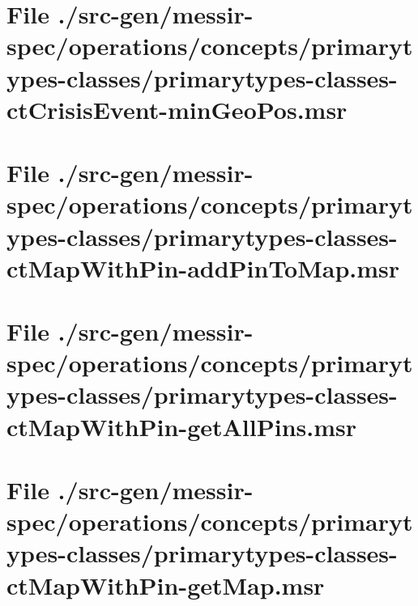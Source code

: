 \section[File /src-gen/messir-spec.../primarytypes-classes-ctCrisisEvent-minGeoPos.msr]{File ./src-gen/messir-spec/operations/concepts/primarytypes-classes/primarytypes-classes-ctCrisisEvent-minGeoPos.msr}
\scriptsize

\normalsize
	
\section[File /src-gen/messir-spec.../primarytypes-classes-ctMapWithPin-addPinToMap.msr]{File ./src-gen/messir-spec/operations/concepts/primarytypes-classes/primarytypes-classes-ctMapWithPin-addPinToMap.msr}
\scriptsize

\normalsize
	
\section[File /src-gen/messir-spec.../primarytypes-classes-ctMapWithPin-getAllPins.msr]{File ./src-gen/messir-spec/operations/concepts/primarytypes-classes/primarytypes-classes-ctMapWithPin-getAllPins.msr}
\scriptsize

\normalsize
	
\section[File /src-gen/messir-spec.../primarytypes-classes-ctMapWithPin-getMap.msr]{File ./src-gen/messir-spec/operations/concepts/primarytypes-classes/primarytypes-classes-ctMapWithPin-getMap.msr}
\scriptsize

\normalsize
	
